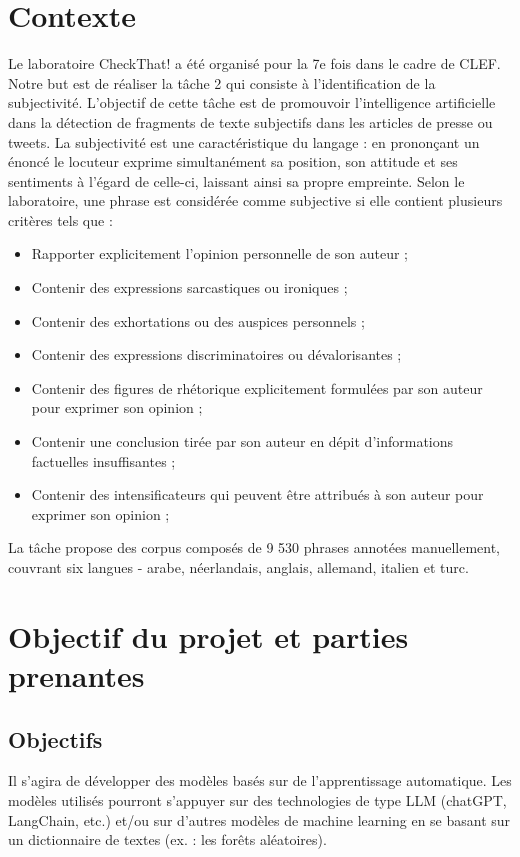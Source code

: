 \documentclass[11pt]{rapport_class}
\begin{document}
\chapter{Contexte}
\qquad Le laboratoire CheckThat! a été organisé pour la 7e fois dans le cadre de CLEF. Notre but est de réaliser la tâche 2 qui consiste à l’identification de la subjectivité. L'objectif de cette tâche est de promouvoir l’intelligence artificielle dans la détection de fragments de texte subjectifs dans les articles de presse ou tweets. La subjectivité est une caractéristique du langage : en prononçant un énoncé le locuteur exprime simultanément sa position, son attitude et ses sentiments à l'égard de celle-ci, laissant ainsi sa propre empreinte. Selon le laboratoire, une phrase est considérée comme subjective si elle contient plusieurs critères tels que :
\begin{itemize}
    \item Rapporter explicitement l'opinion personnelle de son auteur ;
    \item Contenir des expressions sarcastiques ou ironiques ;
    \item Contenir des exhortations ou des auspices personnels ;
    \item Contenir des expressions discriminatoires ou dévalorisantes ;
    \item Contenir des figures de rhétorique explicitement formulées par son auteur pour exprimer son opinion ;
    \item Contenir une conclusion tirée par son auteur en dépit d'informations factuelles insuffisantes ;
    \item Contenir des intensificateurs qui peuvent être attribués à son auteur pour exprimer son opinion ;
\end{itemize}
La tâche propose des corpus composés de 9 530 phrases annotées manuellement, couvrant six langues - arabe, néerlandais, anglais, allemand, italien et turc.

\chapter{Objectif du projet et parties prenantes}
\section{Objectifs}
\qquad Il s'agira de développer des modèles basés sur de l'apprentissage automatique. Les modèles utilisés pourront s’appuyer sur des technologies de type  LLM (chatGPT, LangChain, etc.) et/ou sur d'autres modèles de machine learning en se basant sur un dictionnaire de textes (ex. : les forêts aléatoires).
\end{document}
